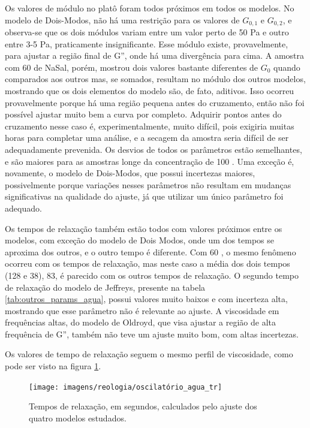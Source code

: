 	Os valores de módulo no platô foram todos próximos em todos os modelos. No modelo de Dois-Modos, não há uma restrição para os valores de \(G_{0,1}\) e \(G_{0,2}\), e observa-se que os dois módulos variam entre um valor perto de 50 Pa e outro entre 3-5 Pa, praticamente insignificante. Esse módulo existe, provavelmente, para ajustar a região final de G'', onde há uma divergência para cima. A amostra com 60 \mM{} de NaSal, porém, mostrou dois valores bastante diferentes de \(G_0\) quando comparados aos outros mas, se somados, resultam no módulo dos outros modelos, mostrando que os dois elementos do modelo são, de fato, aditivos. Isso ocorreu provavelmente porque há uma região pequena antes do cruzamento, então não foi possível ajustar muito bem a curva por completo. Adquirir pontos antes do cruzamento nesse caso é, experimentalmente, muito difícil, pois exigiria muitas horas para completar uma análise, e a secagem da amostra seria difícil de ser adequadamente prevenida. Os desvios de todos os parâmetros estão semelhantes, e são maiores para as amostras longe da concentração de 100 \mM. Uma exceção é, novamente, o modelo de Dois-Modos, que possui incertezas maiores, possivelmente porque variações nesses parâmetros não resultam em mudanças significativas na qualidade do ajuste, já que utilizar um único parâmetro foi adequado.
	
	Os tempos de relaxação também estão todos com valores próximos entre os modelos, com exceção do modelo de Dois Modos, onde um dos tempos se aproxima dos outros, e o outro tempo é diferente. Com 60 \mM, o mesmo fenômeno ocorreu com os tempos de relaxação, mas neste caso a média dos dois tempos (128 e 38), 83, é parecido com os outros tempos de relaxação. O segundo tempo de relaxação do modelo de Jeffreys, presente na tabela \ref{tab:outros_params_agua}, possui valores muito baixos e com incerteza alta, mostrando que esse parâmetro não é relevante ao ajuste. A viscosidade em frequências altas, do modelo de Oldroyd, que visa ajustar a região de alta frequência de G'', também não teve um ajuste muito bom, com altas incertezas.
	
	Os valores de tempo de relaxação seguem o mesmo perfil de viscosidade, como pode ser visto na figura \ref{fig:oscilatorio_agua_tr}.
	
	\begin{figure}[h]
		\centering
		\texttt{[image: imagens/reologia/oscilatório\_agua\_tr]}
		\caption{Tempos de relaxação, em segundos, calculados pelo ajuste dos quatro modelos estudados.}
		\label{fig:oscilatorio_agua_tr}
	\end{figure}
	
